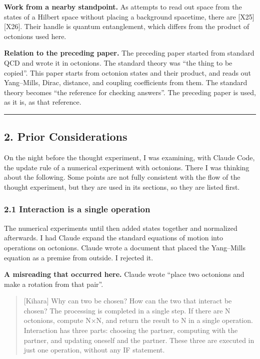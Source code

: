 \documentclass[
  a4paper,
]{article}
\begin{document}
\textbf{Work from a nearby standpoint.} As attempts to read out space
from the states of a Hilbert space without placing a background
spacetime, there are {[}X25{]}{[}X26{]}. Their handle is quantum
entanglement, which differs from the product of octonions used here.

\textbf{Relation to the preceding paper.} The preceding paper started
from standard QCD and wrote it in octonions. The standard theory was
``the thing to be copied''. This paper starts from octonion states and
their product, and reads out Yang--Mills, Dirac, distance, and coupling
coefficients from them. The standard theory becomes ``the reference for
checking answers''. The preceding paper is used, as it is, as that
reference.

\begin{center}\rule{0.5\linewidth}{0.5pt}\end{center}

\subsection{2. Prior Considerations}\label{prior-considerations}

On the night before the thought experiment, I was examining, with Claude
Code, the update rule of a numerical experiment with octonions. There I
was thinking about the following. Some points are not fully consistent
with the flow of the thought experiment, but they are used in its
sections, so they are listed first.

\subsubsection{2.1 Interaction is a single
operation}\label{interaction-is-a-single-operation}

The numerical experiments until then added states together and
normalized afterwards. I had Claude expand the standard equations of
motion into operations on octonions. Claude wrote a document that placed
the Yang--Mills equation as a premise from outside. I rejected it.

\textbf{A misreading that occurred here.} Claude wrote ``place two
octonions and make a rotation from that pair''.

\begin{quote}
{[}Kihara{]} Why can two be chosen? How can the two that interact be
chosen? The processing is completed in a single step. If there are N
octonions, compute N×N, and return the result to N in a single
operation. Interaction has three parts: choosing the partner, computing
with the partner, and updating oneself and the partner. These three are
executed in just one operation, without any IF statement.
\end{quote}
\end{document}
